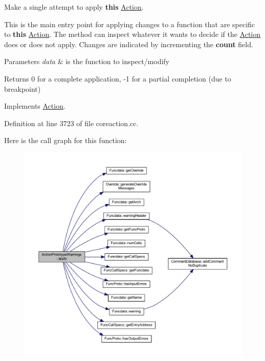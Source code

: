 Make a single attempt to apply {\bfseries{this}} \mbox{\hyperlink{class_action}{Action}}. 

This is the main entry point for applying changes to a function that are specific to {\bfseries{this}} \mbox{\hyperlink{class_action}{Action}}. The method can inspect whatever it wants to decide if the \mbox{\hyperlink{class_action}{Action}} does or does not apply. Changes are indicated by incrementing the {\bfseries{count}} field. 
\begin{DoxyParams}{Parameters}
{\em data} & is the function to inspect/modify \\
\hline
\end{DoxyParams}
\begin{DoxyReturn}{Returns}
0 for a complete application, -\/1 for a partial completion (due to breakpoint) 
\end{DoxyReturn}


Implements \mbox{\hyperlink{class_action_aac1c3999d6c685b15f5d9765a4d04173}{Action}}.



Definition at line 3723 of file coreaction.\+cc.

Here is the call graph for this function\+:
\nopagebreak
\begin{figure}[H]
\begin{center}
\leavevmode
\includegraphics[width=350pt]{class_action_prototype_warnings_a6f52b3f6147c5baac2d7a27c90234001_cgraph}
\end{center}
\end{figure}
\mbox{\label{class_action_prototype_warnings_afe5d4ac774bbeb80c6be7bcdc2578de5}} 
